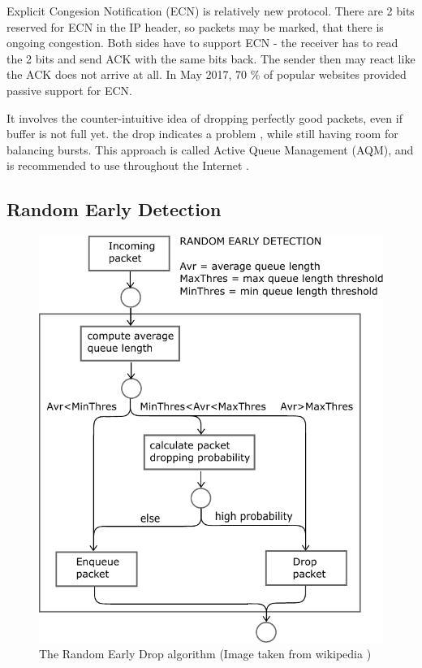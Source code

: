 Explicit Congesion Notification (ECN) \cite{rfc3168:ECN} is relatively new protocol. There are 2 bits reserved for ECN in the IP header, so packets may be marked, that there is ongoing congestion. Both sides have to support ECN  - the receiver has to read the 2 bits and send ACK with the same bits back. The sender then may react like the ACK does not arrive at all. In May 2017, 70 \% of popular websites provided passive support for ECN\cite{ECN:proceedings}.

  It involves the counter-intuitive idea of dropping  perfectly good packets, even if buffer is not full yet. the drop indicates a problem , while still having  room for balancing bursts. This approach is called Active Queue Management (AQM), and is recommended to use throughout the Internet .

\subsection{Random Early Detection}

\begin{figure}
	\centering
	\includegraphics[width=137mm]{drawings/RED}
	\caption{The Random Early Drop algorithm  (Image taken from wikipedia \cite{RED:picture}) }
	\label{fig04:RED}
\end{figure}

